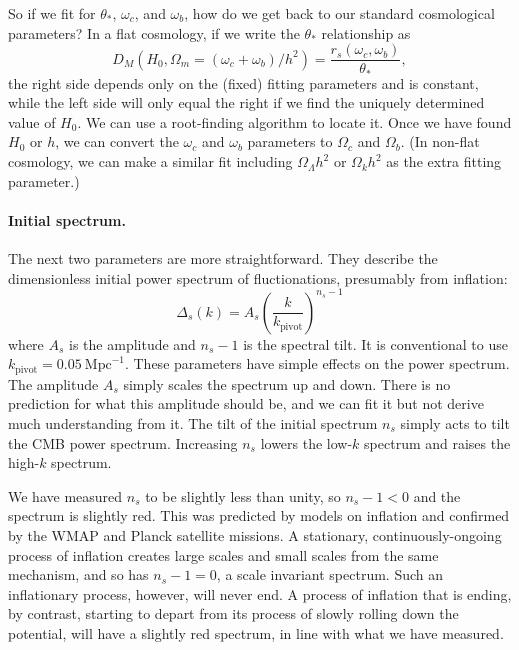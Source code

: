 So if we fit for $\theta_*$, $\omega_c$, and $\omega_b$, how do we get back to our standard cosmological parameters?  In a flat cosmology, if we write the $\theta_*$ relationship as
\begin{equation}
  D_M \left(H_0, \Omega_m = (\omega_c + \omega_b)/h^2 \right)  = \frac{r_s(\omega_c,\omega_b)}{\theta_*},
\end{equation}
the right side depends only on the (fixed) fitting parameters and is constant, while the left side will only equal the right if we find the uniquely determined value of $H_0$.  We can use a root-finding algorithm to locate it.  Once we have found $H_0$ or $h$, we can convert the $\omega_c$ and $\omega_b$ parameters to $\Omega_c$ and $\Omega_b$.  (In non-flat cosmology, we can make a similar fit including $\Omega_\Lambda h^2$ or $\Omega_k h^2$ as the extra fitting parameter.)

\paragraph{Initial spectrum.}
The next two parameters are more straightforward.  They describe the dimensionless initial power spectrum of fluctionations, presumably from inflation:
\begin{equation}
  \Delta_s(k) = A_s \left(\frac{k}{k_\textrm{pivot}} \right)^{n_s - 1}
\end{equation}
where $A_s$ is the amplitude and $n_s-1$ is the spectral tilt.  It is conventional to use $k_\textrm{pivot} = 0.05\ \mbox{Mpc}^{-1}$.  These parameters have simple effects on the power spectrum.  The amplitude $A_s$ simply scales the spectrum up and down.  There is no prediction for what this amplitude should be, and we can fit it but not derive much understanding from it.  The tilt of the initial spectrum $n_s$ simply acts to tilt the CMB power spectrum.  Increasing $n_s$ lowers the low-$k$ spectrum and raises the high-$k$ spectrum.

We have measured $n_s$ to be slightly less than unity, so $n_s - 1 < 0$ and the spectrum is slightly red.  This was predicted by models on inflation and confirmed by the WMAP and Planck satellite missions.  A stationary, continuously-ongoing process of inflation creates large scales and small scales from the same mechanism, and so has $n_s - 1 = 0$, a scale invariant spectrum.  Such an inflationary process, however, will never end.  A process of inflation that is ending, by contrast, starting to depart from its process of slowly rolling down the potential, will have a slightly red spectrum, in line with what we have measured.  

